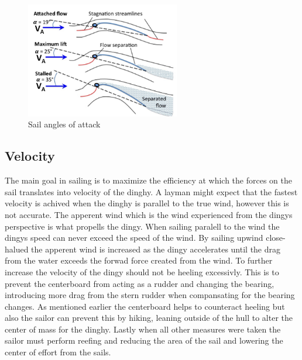 \begin{figure}[H]
\centering
\includegraphics[width=0.6\textwidth]{Figures/max_lift.jpg}
\caption{Sail angles of attack}
\label{max_liftl}
\end{figure}
\subsection{Velocity}
The main goal in sailing is to maximize the efficiency at which the forces on the sail translates into velocity of the dinghy. A layman might expect that the fastest velocity is achived when the dinghy is parallel to the true wind, however this is not accurate. The apperent wind which is the wind experienced from the dingys perspective is what propells the dingy. When sailing paralell to the wind the dingys speed can never exceed the speed of the wind\cite{sail-force}. By sailing upwind close-halued the apperent wind is increased as the dingy accelerates until the drag from the water exceeds the forwad force created from the wind. To further increase the velocity of the dingy should not be heeling excessivly. This is to prevent the centerboard from acting as a rudder and changing the bearing, introducing more drag from the stern rudder when compansating for the bearing changes. As mentioned earlier the centerboard helps to counteract heeling but also the sailor can prevent this by hiking, leaning outside of the hull to alter the center of mass for the dinghy. Lastly when all other measures were taken the sailor must perform reefing and reducing the area of the sail and lowering the center of effort from the sails.